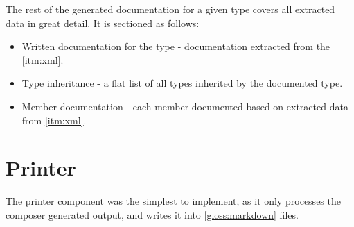 The rest of the generated documentation for a given type covers all extracted data in great detail. It is sectioned as follows:
\begin{itemize}
    \item Written documentation for the type - documentation extracted from the \ref{itm:xml}.
    \item Type inheritance - a flat list of all types inherited by the documented type.
    \item Member documentation - each member documented based on extracted data from \ref{itm:xml}.
\end{itemize}

\section{Printer}

The printer component was the simplest to implement, as it only processes the composer generated output, and writes it into \ref{gloss:markdown} files.